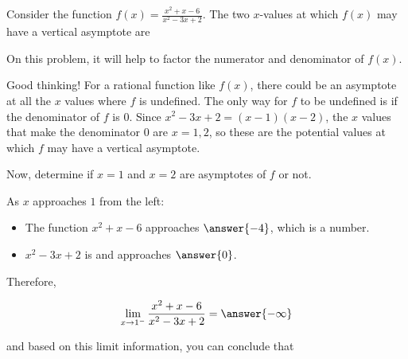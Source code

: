 \documentclass[handout]{ximera}
\begin{document}
\begin{exercise}

Consider the function $f(x) = \frac{x^2+x-6}{x^2-3x+2}$.  The two $x$-values at which $f(x)$ may have a vertical asymptote are

\begin{hint}
On this problem, it will help to factor the numerator and denominator of $f(x)$.

\end{hint}

\begin{multipleChoice}
    
    \begin{feedback}[correct]
    Good thinking!  For a rational function like $f(x)$, there could be an asymptote at all the $x$ values where $f$ is undefined.  The only way for $f$ to be undefined is if the denominator of $f$ is 0.  Since $x^2 -3x + 2 = (x-1)(x-2)$, the $x$ values that make the denominator 0 are $x = 1, 2$, so these are the potential values at which $f$ may have a vertical asymptote. 
    \end{feedback}
\end{multipleChoice}
    
\begin{exercise}
Now, determine if $x = 1$ and $x = 2$ are asymptotes of $f$ or not. 

As $x$ approaches $1$ from the left:  

\begin{itemize}

\item The function $x^2 + x -6$ approaches $\answer{-4}$, which is a  number. 

\item $x^2 - 3x + 2$ is  and approaches $\answer{0}$.

\end{itemize}

Therefore, 

\[ \displaystyle\lim_{x \to 1^-} \frac{x^2+x-6}{x^2-3x+2} = \answer{-\infty} \]

and based on this limit information, you can conclude that

\begin{multipleChoice}
\end{multipleChoice}


\end{exercise}
\end{exercise}
\end{document}
